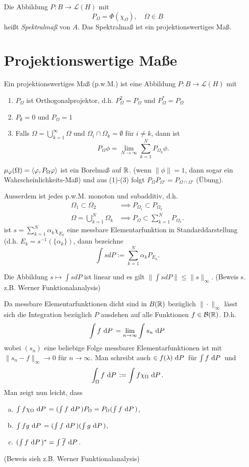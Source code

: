 \documentclass{mycourse}
\begin{document}
Die Abbildung $P: B \to \mathcal L(H)$ mit
\[
P_\Omega= \Phi(\chi_\Omega), \quad \Omega \in B
\]
heißt \emph{Spektralmaß} von $A$. Das Spektralmaß ist ein projektionswertiges Maß.

\section{Projektionswertige Maße}
Ein projektionswertiges Maß (p.w.M.) ist eine Abbildung $P: B \to \mathcal L(H)$ mit
\begin{enumerate}[(1)]
\item $P_\Omega$ ist Orthogonalprojektor, d.h. $P_\Omega^2 = P_\Omega$ und $P_\Omega^* = P_\Omega$
\item $P_\emptyset=0$ und $P_\Omega =1$
\item Falls $\Omega = \bigcup_{k=1}^\infty \Omega$ und $\Omega_i \cap \Omega_k=\emptyset$ für $i\neq k$, dann ist
\[
P_\Omega \phi = \lim_{N\to \infty} \sum_{k=1}^N P_{\Omega_k} \phi.
\] 

\end{enumerate} 
$\mu_\phi(\Omega)=\< \phi, P_\Omega \phi \>$ ist ein Borelmaß auf $\R$. (wenn $\|\phi \|=1$, dann sogar ein Wahrscheinlichkeits-Maß) und aus (1)-(3) folgt $P_\Omega P_{\Omega'}= P_{\Omega \cap \Omega'}$ (Übung).

Ausserdem ist jedes p.w.M. monoton und subadditiv, d.h.
\begin{align*}
\Omega_1 \subset \Omega_2 &\implies P_{\Omega_1} \subset P_{\Omega_2}\\
\Omega= \bigcup_{k=1}^N \Omega_k &\implies P_\Omega \subset \sum_{k=1}^N P_{\Omega_k}.
\end{align*}
ist $s= \sum_{k=1}^N \alpha_k \chi_{E_k}$ eine messbare Elementarfunktion in Standarddarstellung (d.h. $E_k = s^{-1}(\{\alpha_k\})$, dann bezeichne
\[
\int s dP:= \sum_{k=1}^N \alpha_k P_{E_k}.
\]

Die Abbildung $s\mapsto \int s dP$ ist linear und es gilt $\| \int s dP \| \le \| s\|_\infty$. (Beweis s. z.B. Werner Funktionalanalysis)

Da messbare Elementarfunktionen dicht sind in $B(\R)$ bezüglich $\| \cdot \|_\infty$ lässt sich die Integration bezüglich $P$ ausdehen auf alle Funktionen $f\in \mathcal B(\R)$. D.h.
\[
\int f \, \dx[P] = \lim_{n\to \infty} \int s_n \, \dx[P]
\]
wobei $(s_n)$ eine beliebige Folge messbarer Elementarfunktionen ist mit $\| s_n-f\|_\infty\to 0$ für $n\to \infty$. Man schreibt auch $\in f(\lambda) \, \dx[P]$ für $\int f \,\dx[P]$ und
\[
\int_\Omega f \, \dx[P] := \int f \chi_\Omega \, \dx[P].
\]
Man zeigt nun leicht, dass
\begin{enumerate}[a)]
\item $\int f \chi_\Omega \, \dx[P] = (\int f \, \dx[P]) P_\Omega = P_\Omega ( \int f \, \dx[P])$,
\item $\int fg \, \dx[P]= (\int f \, \dx[P]) (\int g \, \dx[P])$, 
\item $(\int f \, \dx[P])^*= \int \overline{f} \, \dx[P]$.
\end{enumerate}
(Beweis sieh z.B. Werner Funktionalanalysis)
\end{document}
